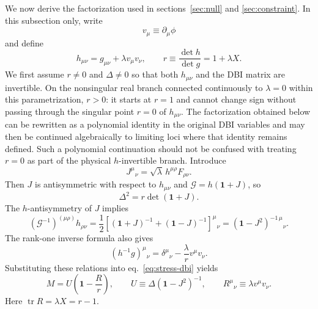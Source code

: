 \documentclass[a4paper,11pt]{article}
\numberwithin{equation}{section}
\newcommand{\tr}{\operatorname{tr}}
\newcommand{\G}{\mathcal G}
\newcommand{\Id}{\mathbf 1}
\begin{document}
We now derive the factorization used in sections~\ref{sec:null} and \ref{sec:constraint}. In this subsection only, write
\begin{equation}
 v_\mu\equiv\partial_\mu\phi
\end{equation}
and define
\begin{equation}
 h_{\mu\nu}=g_{\mu\nu}+\lambda v_\mu v_\nu,
 \qquad
 r\equiv\frac{\det h}{\det g}=1+\lambda X.
 \label{eq:h-r-app}
\end{equation}
We first assume $r\neq0$ and $\Delta\neq0$ so that both $h_{\mu\nu}$ and the DBI matrix are invertible. On the nonsingular real branch connected continuously to $\lambda=0$ within this parametrization, $r>0$: it starts at $r=1$ and cannot change sign without passing through the singular point $r=0$ of $h_{\mu\nu}$. The factorization obtained below can be rewritten as a polynomial identity in the original DBI variables and may then be continued algebraically to limiting loci where that identity remains defined. Such a polynomial continuation should not be confused with treating $r=0$ as part of the physical $h$-invertible branch. Introduce
\begin{equation}
 J^\mu{}_{\nu}=\sqrt\lambda\,h^{\mu\rho}F_{\rho\nu}.
 \label{eq:J-app}
\end{equation}
Then $J$ is antisymmetric with respect to $h_{\mu\nu}$ and $\G=h(\Id+J)$, so
\begin{equation}
 \Delta^2=r\det(\Id+J).
 \label{eq:Delta-J-app}
\end{equation}
The $h$-antisymmetry of $J$ implies
\begin{equation}
 (\G^{-1})^{(\mu\rho)}h_{\rho\nu}
 =\frac12\left[(\Id+J)^{-1}+(\Id-J)^{-1}\right]^\mu{}_{\nu}
 =(\Id-J^2)^{-1\,\mu}{}_{\nu}.
 \label{eq:symmetric-inverse-app}
\end{equation}
The rank-one inverse formula also gives
\begin{equation}
 (h^{-1}g)^\mu{}_{\nu}
 =\delta^\mu{}_{\nu}-\frac{\lambda}{r}v^\mu v_\nu.
 \label{eq:hinvg-app}
\end{equation}
Substituting these relations into eq.~\eqref{eq:stress-dbi} yields
\begin{equation}
 M=U\left(\Id-\frac{R}{r}\right),
 \qquad
 U\equiv\Delta(\Id-J^2)^{-1},
 \qquad
 R^\mu{}_{\nu}\equiv\lambda v^\mu v_\nu.
 \label{eq:M-U-R-app}
\end{equation}
Here $\tr R=\lambda X=r-1$.
\end{document}
